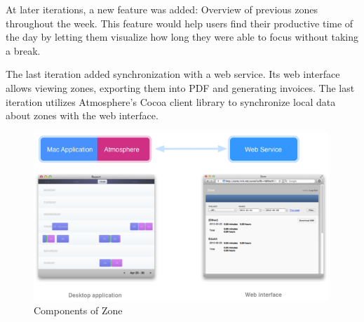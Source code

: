 At later iterations, a new feature was added: Overview of previous zones throughout the week. This feature would help users find their productive time of the day by letting them visualize how long they were able to focus without taking a break.

The last iteration added synchronization with a web service. Its web interface allows viewing zones, exporting them into PDF and generating invoices. The last iteration utilizes Atmosphere's Cocoa client library to synchronize local data about zones with the web interface.

\begin{figure}[htbp]
  \centering
    \includegraphics[height=2.5in]{figures/ZoneDiagram.png}
  \caption{Components of Zone}
  \label{fig:figures_ZoneDiagram}
\end{figure}